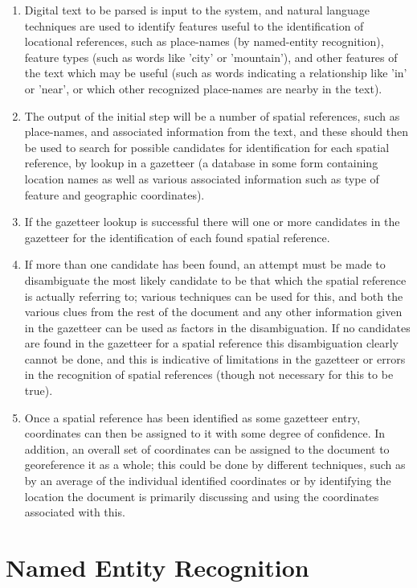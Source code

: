 \documentclass[12pt, a4paper]{report}
\begin{document}
\begin{enumerate}
	\item{Digital text to be parsed is input to the system, and natural language techniques are used to identify features useful to the identification of locational references, such as place-names (by named-entity recognition), feature types (such as words like 'city' or 'mountain'), and other features of the text which may be useful (such as words indicating a relationship like 'in' or 'near', or which other recognized place-names are nearby in the text).}
	\item{The output of the initial step will be a number of spatial references, such as place-names, and associated information from the text, and these should then be used to search for possible candidates for identification for each spatial reference, by lookup in a gazetteer (a database in some form containing location names as well as various associated information such as type of feature and geographic coordinates).}
	\item{If the gazetteer lookup is successful there will one or more candidates in the gazetteer for the identification of each found spatial reference.}
	\item{If more than one candidate has been found, an attempt must be made to disambiguate the most likely candidate to be that which the spatial reference is actually referring to; various techniques can be used for this, and both the various clues from the rest of the document and any other information given in the gazetteer can be used as factors in the disambiguation. If no candidates are found in the gazetteer for a spatial reference this disambiguation clearly cannot be done, and this is indicative of limitations in the gazetteer or errors in the recognition of spatial references (though not necessary for this to be true).}
	\item{Once a spatial reference has been identified as some gazetteer entry, coordinates can then be assigned to it with some degree of confidence. In addition, an overall set of coordinates can be assigned to the document to georeference it as a whole; this could be done by different techniques, such as by an average of the individual identified coordinates or by identifying the location the document is primarily discussing and using the coordinates associated with this.}

\end{enumerate}


\section{Named Entity Recognition}
\end{document}
